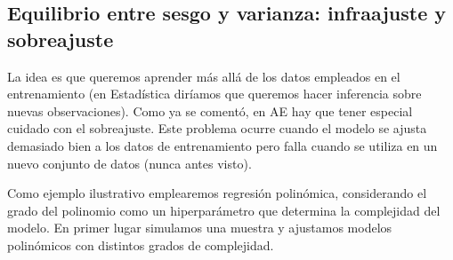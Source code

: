 \documentclass[
]{book}
\theoremstyle{break}
\theoremstyle{definition}
\theoremstyle{definition}
\theoremstyle{definition}
\theoremstyle{remark}
\begin{document}
\hypertarget{bias-variance}{%
\subsection{Equilibrio entre sesgo y varianza: infraajuste y sobreajuste}\label{bias-variance}}

La idea es que queremos aprender más allá de los datos empleados en el entrenamiento (en Estadística diríamos que queremos hacer inferencia sobre nuevas observaciones).
Como ya se comentó, en AE hay que tener especial cuidado con el sobreajuste.
Este problema ocurre cuando el modelo se ajusta demasiado bien a los datos de entrenamiento pero falla cuando se utiliza en un nuevo conjunto de datos (nunca antes visto).

Como ejemplo ilustrativo emplearemos regresión polinómica, considerando el grado del polinomio como un hiperparámetro que determina la complejidad del modelo.
En primer lugar simulamos una muestra y ajustamos modelos polinómicos con distintos grados de complejidad.
\end{document}
